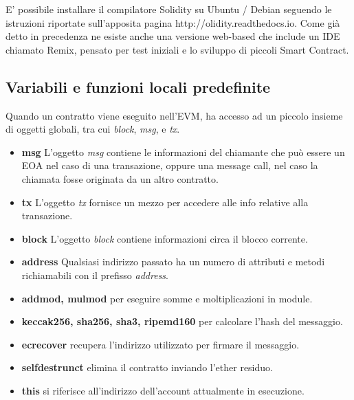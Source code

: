 E' possibile installare il compilatore Solidity su Ubuntu / Debian seguendo le istruzioni riportate sull'apposita pagina http://olidity.readthedocs.io. Come già detto in precedenza ne esiste anche una versione web-based che include un IDE chiamato Remix, pensato per test iniziali e lo sviluppo di piccoli Smart Contract.

\subsection{Variabili e funzioni locali predefinite}
Quando un contratto viene eseguito nell'EVM, ha accesso ad un piccolo insieme di oggetti globali, tra cui \textit{block}, \textit{msg}, e \textit{tx}.
\begin{itemize}
	\item \textbf{msg} L'oggetto \textit{msg} contiene le informazioni del chiamante che può essere un EOA nel caso di una transazione, oppure una message call, nel caso la chiamata fosse originata da un altro contratto.
	\item \textbf{tx}  L'oggetto \textit{tx} fornisce un mezzo per accedere alle info relative alla transazione.
	\item \textbf{block}  L'oggetto \textit{block} contiene informazioni circa il blocco corrente.
	\item \textbf{address}  Qualsiasi indirizzo passato ha un numero di attributi e metodi richiamabili con il prefisso \textit{address}.
	\item \textbf{addmod, mulmod} per eseguire somme e moltiplicazioni in module.
	\item \textbf{keccak256, sha256, sha3, ripemd160} per calcolare l'hash del messaggio.
	\item \textbf{ecrecover} recupera l'indirizzo utilizzato per firmare il messaggio.
	\item \textbf{selfdestrunct} elimina il contratto inviando l'ether residuo.
	\item \textbf{this} si riferisce all'indirizzo dell'account attualmente in esecuzione.
\end{itemize}

